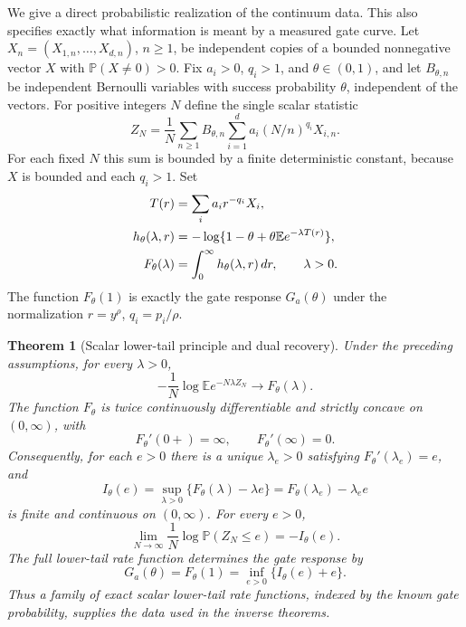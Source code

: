 \documentclass[11pt,letterpaper]{article}
\newtheorem{theorem}{Theorem}[section]
\theoremstyle{definition}
\theoremstyle{remark}
\newcommand{\E}{\mathbb E}
\newcommand{\Pp}{\mathbb P}
\newcommand{\1}{\mathbf 1}
\begin{document}
We give a direct probabilistic realization of the continuum data. This
also specifies exactly what information is meant by a measured gate
curve. Let $X_n=(X_{1,n},\ldots,X_{d,n})$, $n\geq1$, be independent
copies of a bounded nonnegative vector $X$ with $\Pp(X\ne0)>0$.
Fix $a_i>0$, $q_i>1$, and $\theta\in(0,1)$, and let $B_{\theta,n}$
be independent Bernoulli variables with success probability $\theta$,
independent of the vectors. For positive integers $N$ define the single
scalar statistic
\begin{equation}\label{p07:eq:gate-discrete-statistic}
 Z_N=\frac1N\sum_{n\geq1}B_{\theta,n}
                   \sum_{i=1}^d a_i(N/n)^{q_i}X_{i,n}.
\end{equation}
For each fixed $N$ this sum is bounded by a finite deterministic constant,
because $X$ is bounded and each $q_i>1$. Set
\begin{align}
 T(r)&=\sum_i a_i r^{-q_i}X_i,\notag\\
 h_\theta(\lambda,r)
   &=-\log\{1-\theta+\theta\E e^{-\lambda T(r)}\},\notag\\
 F_\theta(\lambda)&=\int_0^\infty h_\theta(\lambda,r)\,dr,
                \qquad\lambda>0.\label{p07:eq:gate-continuum-free-energy}
\end{align}
The function $F_\theta(1)$ is exactly the gate response $G_a(\theta)$
under the normalization $r=y^\rho$, $q_i=p_i/\rho$.

\begin{theorem}[Scalar lower-tail principle and dual recovery]
\label{p07:thm:gate-scalar-ldp}
Under the preceding assumptions, for every $\lambda>0$,
\begin{equation}\label{p07:eq:gate-laplace-limit}
 -\frac1N\log\E e^{-N\lambda Z_N}\longrightarrow F_\theta(\lambda).
\end{equation}
The function $F_\theta$ is twice continuously differentiable and strictly
concave on $(0,\infty)$, with
\[
 F_\theta'(0+)=\infty,\qquad F_\theta'(\infty)=0.
\]
Consequently, for each $e>0$ there is a unique $\lambda_e>0$ satisfying
$F_\theta'(\lambda_e)=e$, and
\begin{equation}\label{p07:eq:gate-rate-definition}
 I_\theta(e)=\sup_{\lambda>0}\{F_\theta(\lambda)-\lambda e\}
            =F_\theta(\lambda_e)-\lambda_e e
\end{equation}
is finite and continuous on $(0,\infty)$. For every $e>0$,
\begin{equation}\label{p07:eq:gate-lower-tail-ldp}
 \lim_{N\to\infty}\frac1N\log\Pp(Z_N\leq e)=-I_\theta(e).
\end{equation}
The full lower-tail rate function determines the gate response by
\begin{equation}\label{p07:eq:gate-rate-duality}
 G_a(\theta)=F_\theta(1)
             =\inf_{e>0}\{I_\theta(e)+e\}.
\end{equation}
Thus a family of exact scalar lower-tail rate functions, indexed by the
known gate probability, supplies the data used in the inverse theorems.
\end{theorem}
\end{document}
